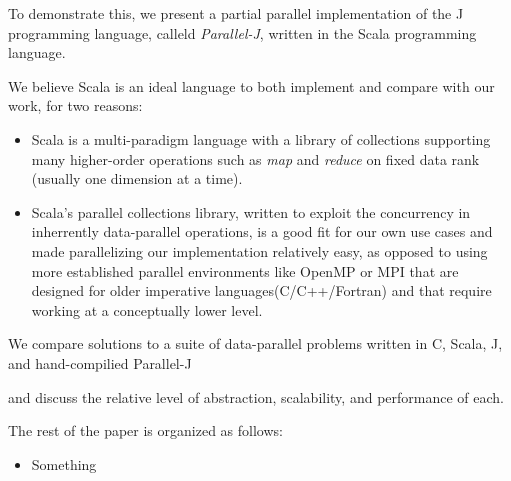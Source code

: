 To demonstrate this, we present a partial parallel implementation of the J programming language, calleld \textit{Parallel-J}, written in the Scala programming language.\begin{comment}TODO cite?\end{comment}
We believe Scala is an ideal language to both implement and compare with our work, for two reasons:
\begin{itemize}
    \item Scala is a multi-paradigm language with a library of collections supporting many higher-order operations such as \textit{map} and \textit{reduce} on fixed data rank (usually one dimension at a time).%
    \item Scala's parallel collections library\cite{pc}, written to exploit the concurrency in inherrently data-parallel operations, is a good fit for our own use cases and made parallelizing our implementation relatively easy, as opposed to using more established parallel environments like OpenMP or MPI that are designed for older imperative languages(C/C++/Fortran) and that require working at a conceptually lower level. %
\end{itemize}
We compare solutions to a suite of data-parallel problems written in C, Scala, J, and hand-compilied Parallel-J\begin{comment}TODO really should change name\end{comment} and discuss the relative level of abstraction, scalability, and performance of each.

The rest of the paper is organized as follows:
\begin{itemize}
	\item Something
\end{itemize}

\nocite{rankanduni}
\nocite{dph}

\begin{comment}
\end{comment}

